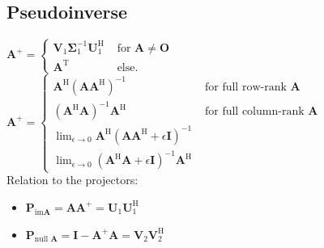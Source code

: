 \documentclass[english]{latex4ei/latex4ei_sheet}
\begin{document}
\begin{sectionbox}
  \subsection{Pseudoinverse}
  $\boldsymbol{A}^{+}= \begin{cases}\boldsymbol{V}_{1} \boldsymbol{\Sigma}_{1}^{-1} \boldsymbol{U}_{1}^{\mathrm{H}} & \text { for } \boldsymbol{A} \neq \mathbf{O} \\ \boldsymbol{A}^{\mathrm{T}} & \text { else. }\end{cases}$\\
  $\boldsymbol{A}^{+}= \begin{cases}\boldsymbol{A}^{\mathrm{H}}\left(\boldsymbol{A} \boldsymbol{A}^{\mathrm{H}}\right)^{-1} & \text { for full row-rank } \boldsymbol{A} \\ \left(\boldsymbol{A}^{\mathrm{H}} \boldsymbol{A}\right)^{-1} \boldsymbol{A}^{\mathrm{H}} & \text { for full column-rank } \boldsymbol{A} \\ \lim _{\epsilon \rightarrow 0} \boldsymbol{A}^{\mathrm{H}}\left(\boldsymbol{A} \boldsymbol{A}^{\mathrm{H}}+\epsilon \mathbf{I}\right)^{-1} & \\ \lim _{\epsilon \rightarrow 0}\left(\boldsymbol{A}^{\mathrm{H}} \boldsymbol{A}+\epsilon \mathbf{I}\right)^{-1} \boldsymbol{A}^{\mathrm{H}} & \end{cases}$\\
  
  Relation to the projectors:
  \begin{itemize}
    \item $\boldsymbol{P}_{\mathrm{im} \boldsymbol{A}}=\boldsymbol{A} \boldsymbol{A}^{+}=\boldsymbol{U}_{1} \boldsymbol{U}_{1}^{\mathrm{H}}$
    \item $\boldsymbol{P}_{\text {null } \boldsymbol{A}}=\boldsymbol{I}-\boldsymbol{A}^{+} \boldsymbol{A} =\boldsymbol{V}_{2} \boldsymbol{V}_{2}^{\mathrm{H}}$
  \end{itemize}
  
\end{sectionbox}
\end{document}
